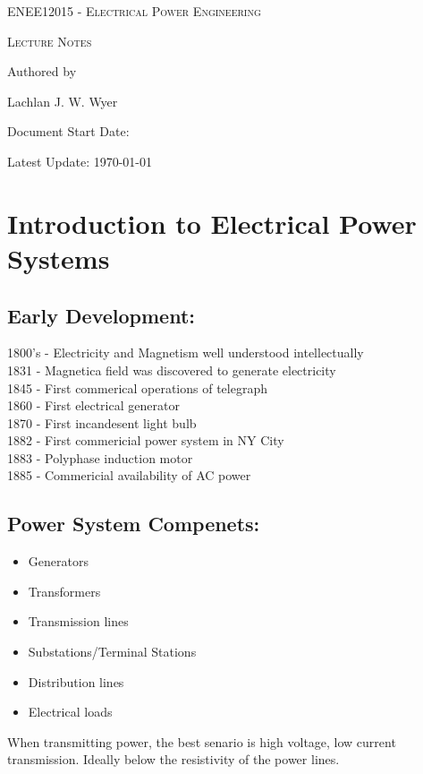 \documentclass[a5paper]{article}
\date{5\textsuperscript{th} of November 2026}
\begin{document}
	\begin{titlepage}
		\centering
		{\Huge \textsc{ENEE12015 - Electrical Power Engineering}\par}
		\vspace{1cm}
		{\Large \textsc{Lecture Notes}\par}
		\vspace{2.5cm}
		\vfill
		Authored by\par
		Lachlan J. W. Wyer
		\vfill
		\makeatletter
		{\large Document Start Date: \@date \par}
		\makeatother
		{\large Latest Update: \today\par}
	\end{titlepage}
	\tableofcontents
	\pagebreak
	
	\section{Introduction to Electrical Power Systems}
	\subsection{Early Development:}
	1800's - Electricity and Magnetism well understood intellectually\\
	1831 - Magnetica field was discovered to generate electricity\\
	1845 - First commerical operations of telegraph\\
	1860 - First electrical generator\\
	1870 - First incandesent light bulb\\
	1882 - First commericial power system in NY City\\
	1883 - Polyphase induction motor\\
	1885 - Commericial availability of AC power

	\subsection{Power System Compenets:}
	\begin{itemize}
		\item Generators
		\item Transformers
		\item Transmission lines
		\item Substations/Terminal Stations
		\item Distribution lines
		\item Electrical loads
	\end{itemize}
	When transmitting power, the best senario is high voltage, low current transmission. Ideally below the resistivity of the power lines.
\end{document}
